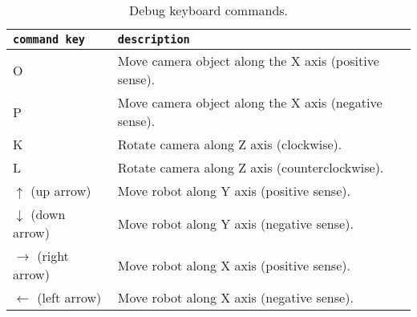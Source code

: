 \begin{table}[!h]
  \centering  
  \begin{tabular}{| l | l |}

    \hline
    \texttt{command key} &
    \texttt{description} \\

    \hline
    \small {O} &
    \parbox[t]{9cm}{\raggedright \small
      Move camera object along the X axis (positive sense).} \\  [1ex]

    \hline
    \small {P} &
    \parbox[t]{9cm}{\raggedright \small
      Move camera object along the X axis (negative sense).} \\  [1ex]

    \hline
    \small {K} &
    \parbox[t]{9cm}{\raggedright \small
      Rotate camera along Z axis (clockwise).} \\  [1ex]

    \hline
    \small {L} &
    \parbox[t]{9cm}{\raggedright \small
      Rotate camera along Z axis (counterclockwise).} \\  [1ex]

    \hline
    \small {$\uparrow$ (up arrow)} &
    \parbox[t]{9cm}{\raggedright \small
      Move robot along Y axis (positive sense).} \\  [1ex]

    \hline
    \small {$\downarrow$ (down arrow)} &
    \parbox[t]{9cm}{\raggedright \small
      Move robot along Y axis (negative sense).} \\  [1ex]

    \hline
    \small {$\rightarrow$ (right arrow)} &
    \parbox[t]{9cm}{\raggedright \small
      Move robot along X axis (positive sense).} \\  [1ex]

    \hline
    \small {$\leftarrow$ (left arrow)} &
    \parbox[t]{9cm}{\raggedright \small
      Move robot along X axis (negative sense).} \\  [1ex]

    \hline

  \end{tabular}
  \caption{Debug keyboard commands.}
  \label{table:debugcommands}
\end{table}
